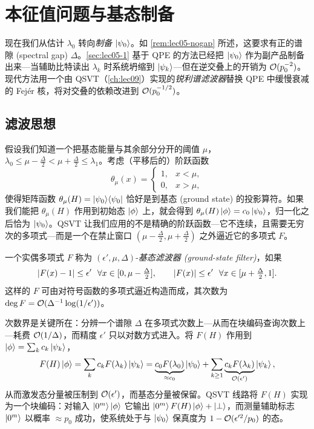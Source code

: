 \section{本征值问题与基态制备}
\label{sec:lec05-3}

现在我们从估计 $\lambda_0$ 转向\emph{制备} $\ket{\psi_0}$。如 \cref{rem:lec05-nogap} 所述，这要求有正的谱隙 (spectral gap) $\Delta$。\cref{sec:lec05-1} 基于 QPE 的方法已经把 $\ket{\psi_0}$ 作为副产品制备出来---当辅助比特读出 $\lambda_k$ 时系统坍缩到 $\ket{\psi_k}$---但在逆交叠上的开销为 $\mathcal{O}(p_0^{-2})$。现代方法用一个由 QSVT（\cref{ch:lec09}）实现的\emph{锐利谱滤波器}替换 QPE 中缓慢衰减的 Fej\'er 核，将对交叠的依赖改进到 $\mathcal{O}(p_0^{-1/2})$。

\subsection*{滤波思想}

假设我们知道一个把基态能量与其余部分分开的阈值 $\mu$，
$\lambda_0\le\mu-\tfrac{\Delta}{2}<\mu+\tfrac{\Delta}{2}\le\lambda_1$。考虑（平移后的）阶跃函数
\[
  \theta_\mu(x)=\begin{cases}1,& x<\mu,\\ 0,& x>\mu,\end{cases}
\]
使得矩阵函数 $\theta_\mu(H)=\ket{\psi_0}\!\bra{\psi_0}$ 恰好是到基态 (ground state) 的投影算符。如果我们能把 $\theta_\mu(H)$ 作用到初始态 $\ket{\phi}$ 上，就会得到 $\theta_\mu(H)\ket{\phi}=c_0\ket{\psi_0}$，归一化之后恰为 $\ket{\psi_0}$。QSVT 让我们应用的不是精确的阶跃函数---它不连续，且需要无穷次的多项式---而是一个在禁止窗口 $(\mu-\tfrac{\Delta}{2},\mu+\tfrac{\Delta}{2})$ 之外逼近它的多项式 $F$。

\begin{definition}[谱滤波多项式]
\label{def:lec05-filter}
一个实偶多项式 $F$ 称为 $(\epsilon',\mu,\Delta)$-\emph{基态滤波器 (ground-state filter)}，如果
\[
  \left\lvert F(x)-1 \right\rvert\le\epsilon'\ \ \forall x\in[0,\mu-\tfrac{\Delta}{2}],
  \qquad
  \left\lvert F(x) \right\rvert\le\epsilon'\ \ \forall x\in[\mu+\tfrac{\Delta}{2},1].
\]
这样的 $F$ 可由对符号函数的多项式逼近构造而成，其次数为 $\deg F=\mathcal{O}(\Delta^{-1}\log(1/\epsilon'))$。
\end{definition}

次数界是关键所在：分辨一个谱隙 $\Delta$ 在多项式次数上---从而在块编码查询次数上---耗费 $\mathcal{O}(1/\Delta)$，而精度 $\epsilon'$ 只以对数方式进入。将 $F(H)$ 作用到 $\ket{\phi}=\sum_k c_k\ket{\psi_k}$，
\[
  F(H)\ket{\phi}=\sum_k c_k F(\lambda_k)\ket{\psi_k}
   =\underbrace{c_0 F(\lambda_0)}_{\approx c_0}\ket{\psi_0}
    +\sum_{k\ge1}\underbrace{c_k F(\lambda_k)}_{\mathcal{O}(\epsilon')}\ket{\psi_k},
\]
从而激发态分量被压制到 $\mathcal{O}(\epsilon')$，而基态分量被保留。QSVT 线路将 $F(H)$ 实现为一个块编码：对输入 $\ket{0^m}\ket{\phi}$ 它输出 $\ket{0^m}F(H)\ket{\phi}+\ket{\perp}$，而测量辅助标志 $\ket{0^m}$ 以概率 $\approx p_0$ 成功，使系统处于与 $\ket{\psi_0}$ 保真度为 $1-\mathcal{O}(\epsilon'^2/p_0)$ 的态。

